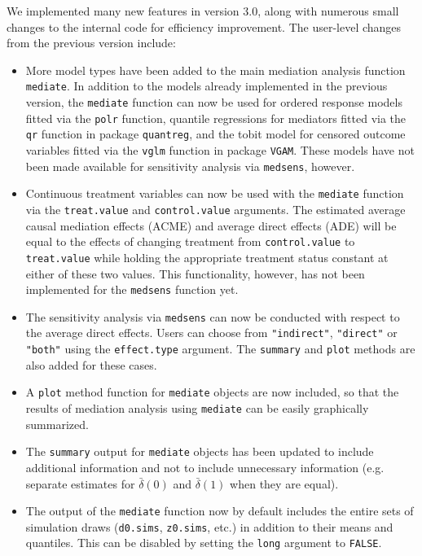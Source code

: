 \documentclass[11pt,letterpaper]{article}
\theoremstyle{plain}
\begin{document}
We implemented many new features in version 3.0, 
along with numerous small changes to the internal code for efficiency
improvement.  The user-level changes from the previous version include:

\begin{itemize}
\item More model types have been added to the main mediation analysis function {\tt mediate}.
In addition to the models already implemented in the previous version, the {\tt mediate}
function can now be used for ordered response models fitted via the {\tt polr}
function, quantile regressions for mediators fitted via the {\tt qr} function in package 
{\tt quantreg}, and the tobit model for censored outcome variables fitted via the
{\tt vglm} function in package {\tt VGAM}.  These models have not been made available
for sensitivity analysis via {\tt medsens}, however.

\item Continuous treatment variables can now be used with the {\tt mediate} function
via the {\tt treat.value} and {\tt control.value} arguments.  The estimated average
causal mediation effects (ACME) and average direct effects (ADE) will be equal to the
effects of changing treatment from {\tt control.value} to {\tt treat.value} while
holding the appropriate treatment status constant at either of these two values.
This functionality, however, has not been implemented for the {\tt medsens} function yet.

\item The sensitivity analysis via {\tt medsens} can now be conducted with respect
to the average direct effects.  Users can choose from {\tt "indirect"}, {\tt "direct"}
or {\tt "both"} using the {\tt effect.type} argument.  The {\tt summary} and {\tt plot}
methods are also added for these cases.

\item A {\tt plot} method function for {\tt mediate} objects are now included,
so that the results of mediation analysis using {\tt mediate} can be easily graphically
summarized.

\item The {\tt summary} output for {\tt mediate} objects has been updated to include
additional information and not to include unnecessary information (e.g. separate estimates
for $\bar\delta(0)$ and $\bar\delta(1)$ when they are equal).

\item The output of the {\tt mediate} function now by default includes the entire sets of
simulation draws ({\tt d0.sims}, {\tt z0.sims}, etc.) in addition to their means
and quantiles.  This can be disabled by setting the {\tt long} argument to {\tt FALSE}.


\end{itemize}
\end{document}
